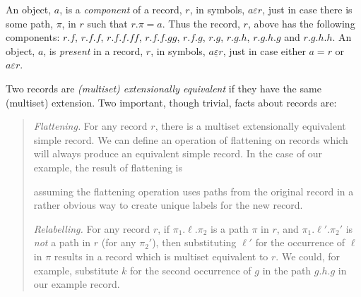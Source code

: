 An object, $a$, is a \textit{component} of a record, $r$, in symbols,
$a\varepsilon r$, just in case there is some path, $\pi$, in $r$ such
that $r.\pi=a$.  Thus the record, $r$, above has the following
components: $r.f$, $r.f.f$, $r.f.f.\mathit{ff}$,
$r.f.f.\mathit{gg}$, $r.f.g$, $r.g$, $r.g.h$, $r.g.h.g$ and
$r.g.h.h$. An object, $a$, is \textit{present} in a record, $r$, in
symbols, $a\underline{\varepsilon} r$, just in case either $a=r$ or
$a\varepsilon r$.

Two
records are {\it (multiset) extensionally equivalent\/} if they have
the same (multiset) extension.  Two important, though trivial, facts
  about records are:
\begin{quote}
{\it Flattening.\/} \label{pg:flattening} For any record $r$, there is a multiset
extensionally equivalent simple record.  We can define an operation of flattening on records which
will always produce an equivalent simple record.  In the case of our
example, the result of flattening is
\begin{display}
\end{display}
assuming the flattening operation uses paths from the original record
in a rather obvious way to create unique labels for the new record.

{\it Relabelling.\/}  \label{pg:relabelling}For any record $r$, if $\pi_1.\ell.\pi_2$ is a
path $\pi$ in $r$, and $\pi_1.\ell'.\pi{_2}'$ is {\it not\/} a path in
$r$ (for any $\pi{_2}'$),
then substituting $\ell'$ for the occurrence of $\ell$ in $\pi$ results in
a record which is multiset equivalent to $r$.  We could, for example,
substitute $k$ for the second occurrence of $g$ in the path $g.h.g$ in our example record.


\end{quote}

